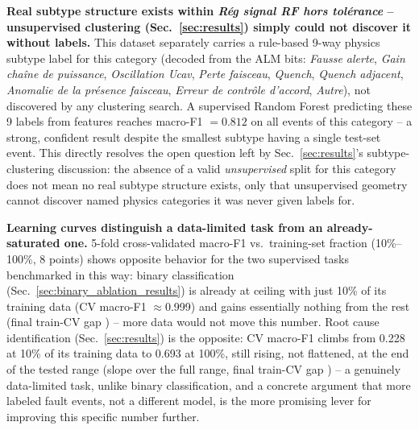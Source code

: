 \textbf{Real subtype structure exists within \textit{Rég signal RF hors tolérance} -- unsupervised clustering (Sec.~\ref{sec:results}) simply could not discover it without labels.} This dataset separately carries a rule-based 9-way physics subtype label for this category (decoded from the ALM bits: \textit{Fausse alerte}, \textit{Gain chaîne de puissance}, \textit{Oscillation Ucav}, \textit{Perte faisceau}, \textit{Quench}, \textit{Quench adjacent}, \textit{Anomalie de la présence faisceau}, \textit{Erreur de contrôle d'accord}, \textit{Autre}), not discovered by any clustering search. A supervised Random Forest predicting these 9 labels from features reaches macro-F1 $=0.812$ on all \MetricZeroZeroDataAttritionChainGtPassingRGSignalRfHorsTolRance{} events of this category %
-- a strong, confident result despite the smallest subtype having a single test-set event. This directly resolves the open question left by Sec.~\ref{sec:results}'s subtype-clustering discussion: the absence of a valid \emph{unsupervised} split for this category does not mean no real subtype structure exists, only that unsupervised geometry cannot discover named physics categories it was never given labels for.

\textbf{Learning curves distinguish a data-limited task from an already-saturated one.} 5-fold cross-validated macro-F1 vs.\ training-set fraction (10\%--100\%, 8 points) shows opposite behavior for the two supervised tasks benchmarked in this way: binary classification (Sec.~\ref{sec:binary_ablation_results}) is already at ceiling with just 10\% of its training data (CV macro-F1 $\approx$0.999) and gains essentially nothing from the rest (final train-CV gap \MetricOneZeroPhaseThreeWeaknessDiagnosisBinaryLearningCurveFinalGap{}) -- more data would not move this number. Root cause identification (Sec.~\ref{sec:results}) is the opposite: CV macro-F1 climbs from 0.228 at 10\% of its training data to 0.693 at 100\%, %
still rising, not flattened, at the end of the tested range (slope \MetricOneZeroPhaseThreeWeaknessDiagnosisRootCauseLearningCurveCvSlope{} over the full range, final train-CV gap \MetricOneZeroPhaseThreeWeaknessDiagnosisRootCauseLearningCurveFinalGap{}) -- a genuinely data-limited task, unlike binary classification, and a concrete argument that more labeled fault events, not a different model, is the more promising lever for improving this specific number further.

